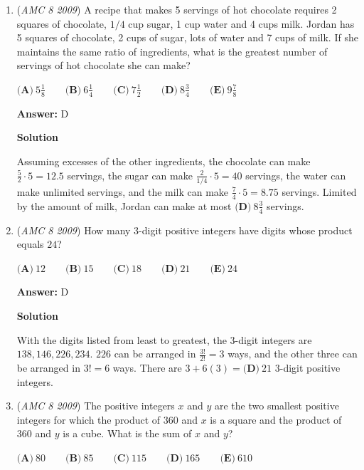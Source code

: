 \begin{enumerate}
 


	\item (\textit{AMC 8 2009}) A recipe that makes 5 servings of hot chocolate requires 2 squares of chocolate, $1/4$ cup sugar, 1 cup water and 4 cups milk. Jordan has 5 squares of chocolate, 2 cups of sugar, lots of water and 7 cups of milk. If she maintains the same ratio of ingredients, what is the greatest number of servings of hot chocolate she can make? 


 $\textbf{(A)}\ 5\frac{1}8\qquad\textbf{(B)}\ 6\frac{1}4\qquad\textbf{(C)}\ 7\frac{1}2\qquad\textbf{(D)}\ 8\frac{3}4\qquad\textbf{(E)}\ 9\frac{7}8$

 \textbf{Answer: }D



\textbf{Solution}

Assuming excesses of the other ingredients, the chocolate can make $\frac52 \cdot 5=12.5$ servings, the sugar can make $\frac{2}{1/4} \cdot 5 = 40$ servings, the water can make unlimited servings, and the milk can make $\frac74 \cdot 5 = 8.75$ servings. Limited by the amount of milk, Jordan can make at most $\boxed{\textbf{(D)}\ 8 \frac34}$ servings.

 


	\item (\textit{AMC 8 2009}) How many 3-digit positive integers have digits whose product equals $24$?


 $\textbf{(A)}\ 12\qquad\textbf{(B)}\ 15\qquad\textbf{(C)}\ 18\qquad\textbf{(D)}\ 21\qquad\textbf{(E)}\ 24$

 \textbf{Answer: }D



\textbf{Solution}

With the digits listed from least to greatest, the $3$-digit integers are $138,146,226,234$. $226$ can be arranged in $\frac{3!}{2!} = 3$ ways, and the other three can be arranged in $3!=6$ ways. There are $3+6(3) = \boxed{\textbf{(D)}\ 21}$ $3$-digit positive integers.

 


 


	\item (\textit{AMC 8 2009}) The positive integers $x$ and $y$ are the two smallest positive integers for which the product of $360$ and $x$ is a square and the product of $360$ and $y$ is a cube. What is the sum of $x$ and $y$?


 $\textbf{(A)}\ 80\qquad\textbf{(B)}\ 85\qquad\textbf{(C)}\ 115\qquad\textbf{(D)}\ 165\qquad\textbf{(E)}\ 610$


\end{enumerate}
